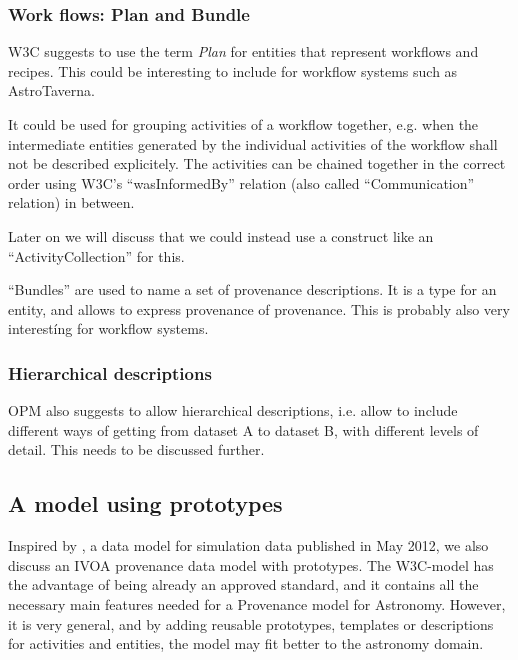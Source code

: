 \subsubsection{Work flows: Plan and Bundle}
W3C suggests to use the term \emph{Plan} for entities that represent workflows and recipes. This could be interesting to include for workflow systems such as AstroTaverna. 

It could be used for grouping activities of a workflow together, e.g. when
the intermediate entities generated by the individual activities of the workflow shall not be described explicitely. The activities can be chained together in the correct order using W3C's ``wasInformedBy'' relation (also called ``Communication'' relation) in between.

Later on we will discuss that we could instead use a construct like an ``ActivityCollection'' for this.

``Bundles'' are used to name a set of provenance descriptions. It is a type for an entity, and allows to express provenance of provenance. This is probably also very interestíng for workflow systems.


\subsubsection{Hierarchical descriptions}
OPM also suggests to allow hierarchical descriptions, i.e. allow to include different ways of getting from dataset A to dataset B, with different levels of detail. 
This needs to be discussed further. 


\subsection{A model using prototypes}
Inspired by \cite{std:SimDM}, a data model for simulation data published in May 2012, we also discuss an IVOA provenance data model with prototypes. 
The W3C-model has the advantage of being already an approved standard, and it contains all the necessary main features needed for a Provenance model for Astronomy. However, it is very general, and by adding reusable prototypes, templates or descriptions for activities and entities,  the model may fit better to the astronomy domain.


